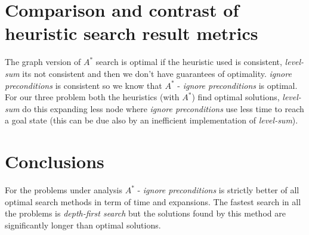 \documentclass[10pt,a4paper]{article}
\begin{document}
\section{Comparison and contrast of heuristic search result metrics}

\begin{table}
\caption{Comparison and contrast of heuristic search result metrics.}\label{tab:heu}
\end{table}

The graph version of $A^{*}$ search is optimal if the heuristic used is consistent, \textit{level-sum} its not consistent and then we don't have 
guarantees of optimality. \emph{ignore preconditions} is consistent so we know that $A^{*}$ - \emph{ignore preconditions} is optimal. For our three problem both the heuristics (with $A^{*}$) find optimal solutions, \emph{level-sum} do this expanding less node where \emph{ignore preconditions} use less time to reach a goal state (this can be due also by an inefficient implementation of \emph{level-sum}).

\section{Conclusions}

For the problems under analysis $A^{*}$ - \emph{ignore preconditions} is  strictly better of all optimal search methods in term of time and expansions. The fastest search in all the problems is \emph{depth-first search} but the solutions found by this method are significantly longer than optimal solutions.
\end{document}

